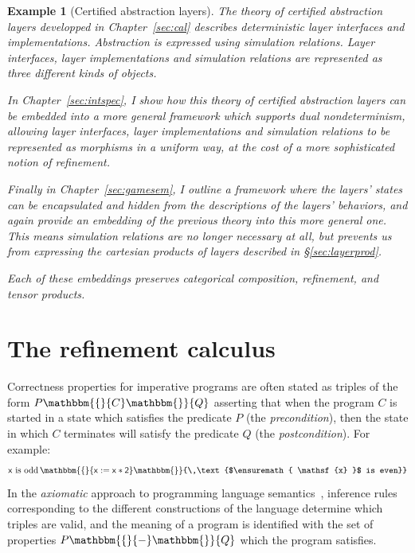 \documentclass[11pt,oneside,draft]{book}
\newtheorem{example}[theorem]{Example}
\theoremstyle{definition}
\newcommand{\kw}[1]{\ensuremath{ \mathsf{#1} }}
\newcommand{\htr}[3]{{ {#1} \mathbbm{\{} {#2} \mathbbm{\}} {#3} }}
\begin{document}
\begin{example}[Certified abstraction layers] %
The theory of certified abstraction layers
developped in Chapter~\ref{sec:cal}
describes deterministic layer interfaces
and implementations.
Abstraction is expressed using simulation relations.
Layer interfaces, layer implementations and simulation relations
are represented as three different kinds of objects.

In Chapter~\ref{sec:intspec},
I show how this theory of certified abstraction layers
can be embedded into a more general framework
which supports dual nondeterminism,
allowing layer interfaces, layer implementations and simulation relations
to be represented as morphisms in a uniform way,
at the cost of a more sophisticated notion of refinement.

Finally in Chapter~\ref{sec:gamesem},
I outline a framework where the layers' states
can be encapsulated and hidden from
the descriptions of the layers' behaviors,
and again provide an embedding of the previous theory
into this more general one.
This means simulation relations are no longer necessary at all,
but prevents us from expressing the cartesian products
of layers described in \S\ref{sec:layerprod}.

Each of these embeddings preserves categorical composition,
refinement, and tensor products.
\end{example}



\section{The refinement calculus} \label{sec:refcal} %


Correctness properties for imperative programs
are often stated as triples of the form $\htr{P}{C}{Q}$
asserting that
when the program $C$ is started in a state which
satisfies the predicate $P$ (the \emph{precondition}),
then the state in which $C$ terminates
will satisfy the predicate $Q$ (the \emph{postcondition}).
For example:
\[
    \htr{\text{$\kw{x}$ is odd}\,}{\kw{x := x * 2}}{\,\text{$\kw{x}$ is even}}
\]
In the \emph{axiomatic} approach
to programming language semantics~\citep{hoare69},
inference rules
corresponding to the different constructions of the language
determine which triples are valid,
and the meaning of a program is identified with
the set of properties $\htr{P}{-}{Q}$
which the program satisfies.
\end{document}
